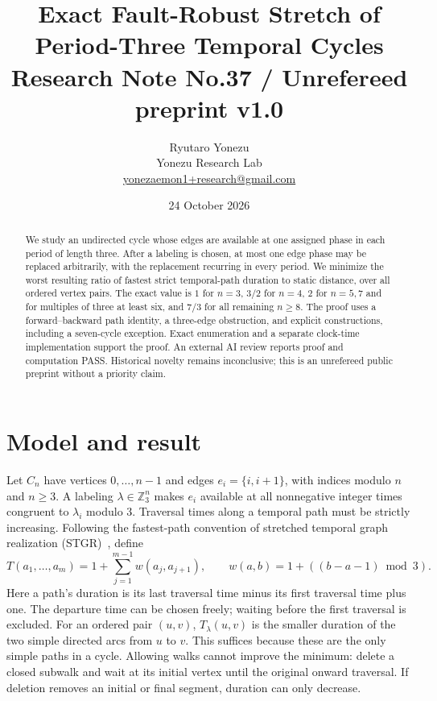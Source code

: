 \documentclass[11pt,a4paper]{article}
\title{\vspace{-1.3em}\textbf{Exact Fault-Robust Stretch of\\Period-Three Temporal Cycles}\\[5pt]\large Research Note No.37 / Unrefereed preprint v1.0}
\author{Ryutaro Yonezu\\Yonezu Research Lab\\\small\href{mailto:yonezaemon1+research@gmail.com}{yonezaemon1+research@gmail.com}}
\date{24 October 2026}
\newcommand{\Z}{\mathbb Z}
\begin{document}
\maketitle
\thispagestyle{fancy}
\begin{abstract}
We study an undirected cycle whose edges are available at one assigned phase in each period of length three. After a labeling is chosen, at most one edge phase may be replaced arbitrarily, with the replacement recurring in every period. We minimize the worst resulting ratio of fastest strict temporal-path duration to static distance, over all ordered vertex pairs. The exact value is $1$ for $n=3$, $3/2$ for $n=4$, $2$ for $n=5,7$ and for multiples of three at least six, and $7/3$ for all remaining $n\ge8$. The proof uses a forward--backward path identity, a three-edge obstruction, and explicit constructions, including a seven-cycle exception. Exact enumeration and a separate clock-time implementation support the proof. An external AI review reports proof and computation PASS. Historical novelty remains inconclusive; this is an unrefereed public preprint without a priority claim.
\end{abstract}

\section{Model and result}
Let $C_n$ have vertices $0,\ldots,n-1$ and edges $e_i=\{i,i+1\}$, with indices modulo $n$ and $n\ge3$. A labeling $\lambda\in\Z_3^n$ makes $e_i$ available at all nonnegative integer times congruent to $\lambda_i$ modulo $3$. Traversal times along a temporal path must be strictly increasing. Following the fastest-path convention of stretched temporal graph realization (STGR)~\cite{mertzios}, define
\begin{equation}
 T(a_1,\ldots,a_m)=1+\sum_{j=1}^{m-1}w(a_j,a_{j+1}),\qquad
 w(a,b)=1+((b-a-1)\bmod3).
 \label{eq:duration}
\end{equation}
Here a path's duration is its last traversal time minus its first traversal time plus one. The departure time can be chosen freely; waiting before the first traversal is excluded. For an ordered pair $(u,v)$, $T_\lambda(u,v)$ is the smaller duration of the two simple directed arcs from $u$ to $v$. This suffices because these are the only simple paths in a cycle. Allowing walks cannot improve the minimum: delete a closed subwalk and wait at its initial vertex until the original onward traversal. If deletion removes an initial or final segment, duration can only decrease.
\end{document}
